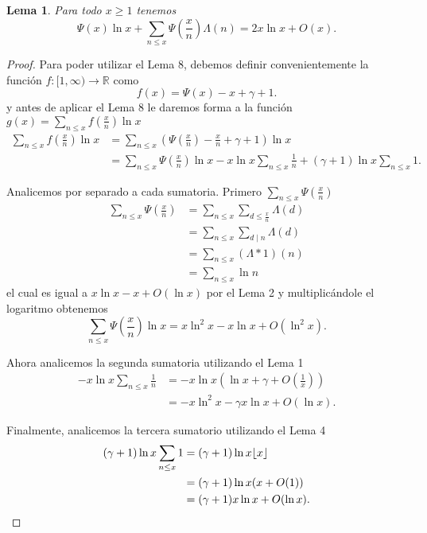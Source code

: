 \documentclass{article}
\DeclarePairedDelimiter\floor{\lfloor}{\rfloor}
\newtheorem{lemma}[theorem]{Lema}
\theoremstyle{definition}
\theoremstyle{remark}
\newcommand{\BR}{\mathbb R}
\begin{document}
\begin{lemma}
Para todo $x \geq 1$ tenemos
$$\Psi(x) \ln x + \sum_{n \leq x} \Psi\left(\frac{x}{n}\right)\Lambda(n) = 2x\ln x + O(x).$$
\end{lemma}

\begin{proof}
Para poder utilizar el Lema 8, debemos definir convenientemente la funci\'on $f : [1, \infty) \to \BR$ como
$$f(x) = \Psi(x) - x + \gamma + 1.$$
y antes de aplicar el Lema 8 le daremos forma a la funci\'on $g(x) = \sum_{n \leq x} f\left(\frac{x}{n}\right)\ln x$
\begin{align*}
\sum_{n \leq x} f\left(\frac{x}{n}\right)\ln x &= \sum_{n \leq x} \left(\Psi\left(\frac{x}{n}\right) - \frac{x}{n} + \gamma + 1\right) \ln x \\
&= \sum_{n \leq x} \Psi\left(\frac{x}{n}\right) \ln x - x \ln x \sum_{n \leq x} \frac{1}{n} + (\gamma + 1) \ln x \sum_{n \leq x} 1.
\end{align*}

Analicemos por separado a cada sumatoria. Primero $\sum_{n \leq x} \Psi\left(\frac{x}{n}\right)$
\begin{align*}
\sum_{n \leq x} \Psi\left(\frac{x}{n}\right) &= \sum_{n \leq x} \sum_{d \leq \frac{x}{n}} \Lambda(d) \\
&= \sum_{n \leq x} \sum_{d \mid n} \Lambda(d) \\
&= \sum_{n \leq x} (\Lambda * 1)(n) \\
&= \sum_{n \leq x} \ln n
\end{align*}
el cual es igual a $x\ln x - x + O(\ln x)$ por el Lema 2 y multiplic\'andole el logaritmo obtenemos
$$\sum_{n \leq x} \Psi\left(\frac{x}{n}\right)\ln x = x \ln^2 x - x \ln x + O(\ln^2 x).$$

Ahora analicemos la segunda sumatoria utilizando el Lema 1
\begin{align*}
-x \ln x \sum_{n \leq x} \frac{1}{n} &= -x \ln x \left(\ln x + \gamma + O\left(\frac{1}{x}\right)\right) \\
&= -x \ln^2 x - \gamma x \ln x + O(\ln x).
\end{align*}

Finalmente, analicemos la tercera sumatorio utilizando el Lema 4
\begin{align*}
(\gamma + 1) \ln x \sum_{n \leq x} 1 &= (\gamma + 1) \ln x \floor{x} \\
&= (\gamma + 1) \ln x (x + O(1)) \\
&= (\gamma + 1) x \ln x + O(\ln x).
\end{align*}


\end{proof}
\end{document}
